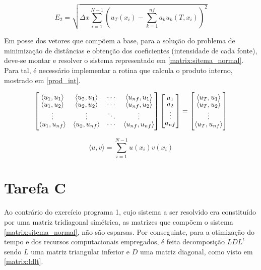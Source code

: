 \documentclass[12pt]{article}
\begin{document}
\begin{spacing}{1.5}
\begin{equation}\label{rms}
E_2 = \sqrt{\Delta x \sum_{i=1}^{N - 1} \left(u_T(x_i) - \sum_{k=1}^{n f}{a_k u_k(T,x_i)}\right)^2}  
\end{equation}

Em posse dos vetores que compõem a base, para a solução do problema de minimização de distâncias e obtenção dos coeficientes (intensidade de cada fonte), deve-se montar e resolver o sistema representado em \eqref{matrix:sitema_normal}. Para tal, é necessário implementar a rotina que calcula o produto interno, mostrado em \eqref{prod_int}.

\begin{equation}\label{matrix:sitema_normal}
    \renewcommand*{\arraystretch}{0.75}
    \begin{bmatrix}
        \langle u_1, u_1\rangle & \langle u_2, u_1\rangle & \cdots & \langle u_{n f}, u_1\rangle\\
        \langle u_1, u_2\rangle & \langle u_2, u_2\rangle & \cdots & \langle u_{n f}, u_2\rangle\\
        \vdots  & \vdots & \ddots & \vdots \\
        \langle u_1, u_{n f}\rangle & \langle u_2, u_{n f}\rangle & \cdots & \langle u_{n f},  u_{n f}\rangle
    \end{bmatrix}
    \begin{bmatrix}
    a_1 \\
    a_2 \\
    \vdots \\
    a_{n f}
    \end{bmatrix}
    =
    \begin{bmatrix}
    \langle u_T, u_1\rangle \\
    \langle u_T, u_2\rangle \\
    \vdots \\
    \langle u_T, u_{n f}\rangle
    \end{bmatrix}
\end{equation}

\begin{equation}\label{prod_int}
\langle u, v\rangle = \sum_{i=1}^{N - 1}{u(x_i) v(x_i)}
\end{equation}


\section{Tarefa C}

Ao contrário do exercício programa 1, cujo sistema a ser resolvido era constituído por uma matriz tridiagonal simétrica, as matrizes que compõem o sistema \eqref{matrix:sitema_normal}, não são esparsas. Por conseguinte, para a otimização do tempo e dos recursos computacionais empregados, é feita decomposição\supercite{burden&faires} $LDL^t$ sendo $L$ uma matriz triangular inferior e $D$ uma matriz diagonal, como visto em \eqref{matrix:ldlt}.



\end{spacing}
\end{document}
